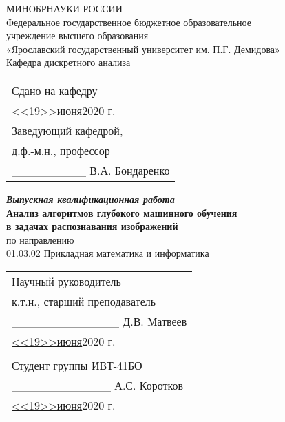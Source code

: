 \begin{titlepage}
  \begin{center}  
    МИНОБРНАУКИ   РОССИИ\\  
    Федеральное государственное бюджетное образовательное\\
    учреждение высшего образования\\  
    «Ярославский государственный университет им. П.Г. Демидова»\\  
    \vspace{1em}
    Кафедра дискретного анализа
  \end{center}
  \vspace{1em}
  \null\hfill\begin{tabular}{l@{}}
    Сдано на кафедру\\
    \underline{<<19>>\hspace{2em}июня\hspace{2em}}2020 г.\\
    Заведующий кафедрой,\\
    д.ф.-м.н., профессор\\
    \_\_\_\_\_\_\_\_\_ В.А. Бондаренко\\
  \end{tabular}
  \vspace{2em}
  \begin{center}
    \textbf{\textit{Выпускная квалификационная работа}}\\    
    \vspace{1em}
    \textbf{Анализ алгоритмов глубокого машинного обучения \\ в задачах распознавания изображений}\\
    \vspace{1em}
    по направлению \\ 01.03.02 Прикладная математика и информатика\\
  \end{center}
  \vspace{1em}
  \null\hfill\begin{tabular}{l@{}}
    Научный руководитель\\
    к.т.н., старший преподаватель\\
    \_\_\_\_\_\_\_\_\_\_\_\_\_ Д.В. Матвеев\\
    \underline{<<19>>\hspace{2em}июня\hspace{2em}}2020 г.\\
  \vspace{1em}\\
    Студент группы ИВТ-41БО\\
    \_\_\_\_\_\_\_\_\_\_\_\_ А.С. Коротков\\
    \underline{<<19>>\hspace{2em}июня\hspace{2em}}2020 г.\\
  \end{tabular}
  \vfill
\end{titlepage}
\clearpage
